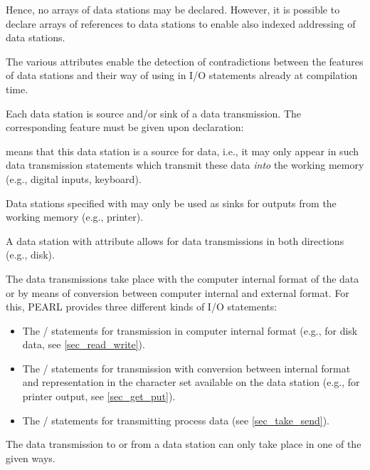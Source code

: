 Hence, no arrays of data stations may be declared. However, it is
possible to declare arrays of references to data stations to enable also
indexed addressing of data stations.

The various attributes enable the detection of contradictions between
the features of data stations and their way of using in I/O statements
already at compilation time.

\begin{grammarframe}

\end{grammarframe}

Each data station is source and/or sink of a data transmission. The
corresponding feature must be given upon declaration:

\begin{grammarframe}

\end{grammarframe}

 
 means that this data station is a source for data, i.e., it may only
appear in such data transmission statements which transmit these data
{\em into} the working memory (e.g., digital inputs, keyboard).

Data stations specified with   
may only be used as sinks for outputs
from the working memory (e.g., printer).

A data station with attribute  
 allows for data transmissions in
both directions (e.g., disk).

The data transmissions take place with the computer internal format of
the data or by means of conversion between computer internal and
external format. For this, PEARL provides three different kinds of I/O
statements:
\begin{itemize}
\item The / statements for transmission in computer internal
format (e.g., for disk data, see \ref{sec_read_write}).
\item The / statements for transmission with conversion between
internal format and representation in the character set available on the
data station (e.g., for printer output, see \ref{sec_get_put}).
\item The / statements for transmitting process data (see
\ref{sec_take_send}).
\end{itemize}

The data transmission to or from a data station can only take place in
one of the given ways.

